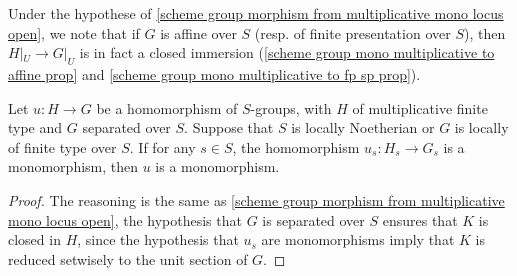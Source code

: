 \begin{remark}
Under the hypothese of \cref{scheme group morphism from multiplicative mono locus open}, we note that if $G$ is affine over $S$ (resp. of finite presentation over $S$), then $H|_U\to G|_U$ is in fact a closed immersion (\cref{scheme group mono multiplicative to affine prop} and \cref{scheme group mono multiplicative to fp sp prop}).
\end{remark}

\begin{corollary}\label{scheme group morphism from multiplicative mono if on fiber}
Let $u:H\to G$ be a homomorphism of $S$-groups, with $H$ of multiplicative finite type and $G$ separated over $S$. Suppose that $S$ is locally Noetherian or $G$ is locally of finite type over $S$. If for any $s\in S$, the homomorphism $u_s:H_s\to G_s$ is a monomorphism, then $u$ is a monomorphism.
\end{corollary}
\begin{proof}
The reasoning is the same as \cref{scheme group morphism from multiplicative mono locus open}, the hypothesis that $G$ is separated over $S$ ensures that $K$ is closed in $H$, since the hypothesis that $u_s$ are monomorphisms imply that $K$ is reduced setwisely to the unit section of $G$.
\end{proof}

